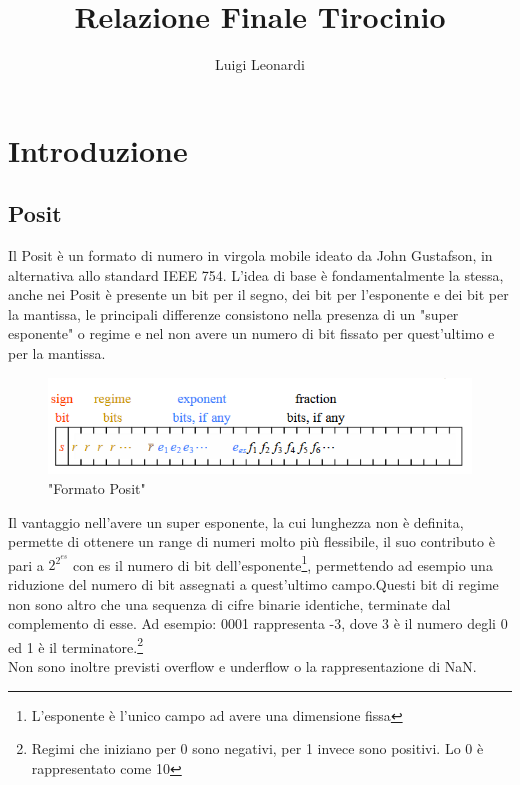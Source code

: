 \documentclass[a4paper,11pt]{article}
\author{Luigi Leonardi}
\title{Relazione Finale Tirocinio}
\date{}
\begin{document}
	\maketitle
	\tableofcontents
	
	

\newpage
	\section{Introduzione}
	\subsection{Posit}

	Il Posit è un formato di numero in virgola mobile ideato da John Gustafson\cite{john}, in alternativa allo standard IEEE 754. L'idea di base è fondamentalmente la stessa, anche nei Posit è presente un bit per il segno, dei bit per l'esponente e dei bit per la mantissa, le principali differenze consistono nella presenza di un "super esponente" o regime e nel non avere un numero di bit fissato per quest'ultimo e per la mantissa. \\
	\begin{figure}[h]
	\includegraphics[scale=0.8]{posit}
	\centering
	\caption{"Formato Posit"}
	\end{figure}Il vantaggio nell'avere un super esponente, la cui lunghezza non è definita, permette di ottenere un range di numeri molto più flessibile, il suo contributo è pari a $2^{2^{es}}$ con es il numero di bit dell'esponente\footnote{L'esponente è l'unico campo ad avere una dimensione fissa}, permettendo ad esempio una riduzione del numero di bit assegnati a quest'ultimo campo.\newline Questi bit di regime non sono altro che una sequenza di cifre binarie identiche, terminate dal complemento di esse. \newline Ad esempio: 0001 rappresenta -3, dove 3 è il numero degli 0 ed 1 è il terminatore.\footnote{Regimi che iniziano per 0 sono negativi, per 1 invece sono positivi. Lo 0 è rappresentato come 10} \\
	Non sono inoltre previsti overflow e underflow o la rappresentazione di NaN.
	
\end{document}
